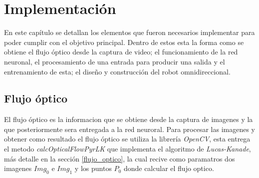 \documentclass{iccmemoria}
\begin{document}
\begin{table}[H]
\caption[Paquete de datos de movimiento \emph{mouse} PS/2.]{Paquete de datos del movimiento del \emph{mouse}.}
\label{tab:ps/2 package}
\end{table}



\chapter{Implementación}

En este capítulo se detallan los elementos que fueron necesarios implementar para poder cumplir con el objetivo principal. Dentro de estos esta la forma como se obtiene el flujo óptico desde la captura de video; el funcionamiento de la red neuronal, el procesamiento de una entrada para producir una salida y el entrenamiento de esta; el diseño y construcción del robot omnidireccional.\\
 
\section{Flujo óptico}

El flujo óptico es la informacion que se obtiene desde la captura de imagenes y la que posteriormente sera entregada a la red neuroral. Para procesar las imagenes y obtener como resultado el flujo óptico se utiliza la librería \emph{OpenCV}, esta entrega el metodo \emph{calcOpticalFlowPyrLK} que implementa el algoritmo de \emph{Lucas-Kanade}, más detalle en la sección \ref{flujo_optico}, la cual recive como paramatros dos imagenes $Img_0$ e $Img_1$ y los puntos $P_0$ donde calcular el flujo optico.\\
\end{document}
